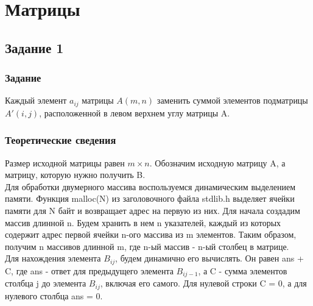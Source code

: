 \documentclass[12pt,a4paper]{report}
\begin{document}
\chapter{Матрицы}
\section{Задание 1}
\subsection{Задание}
Каждый элемент $a_{i j}$ матрицы $A(m, n)$ заменить суммой элементов подматрицы $A'(i, j)$, расположенной в левом верхнем углу матрицы A.
\subsection{Теоретические сведения}
Размер исходной матрицы равен $m \times n$. Обозначим исходную матрицу A, а матрицу, которую нужно  получить B.\\
Для обработки двумерного массива воспользуемся динамическим выделением памяти. Функция malloc(N) из заголовочного файла stdlib.h выделяет ячейки памяти для N байт и возвращает адрес на первую из них. Для начала создадим массив длинной n. Будем хранить в нем n указателей, каждый из которых содержит адрес первой ячейки n-ого массива из m элементов. Таким образом, получим n массивов длинной m, где n-ый массив - n-ый столбец в матрице. \\
Для нахождения элемента $B_{i j}$, будем динамично его вычислять. Он равен ans + C, где ans - ответ для предыдущего элемента $B_{i j-1}$, а C - сумма элементов столбца j до элемента $B_{i j}$, включая его самого. Для нулевой строки C = 0, а для нулевого столбца ans = 0.
\end{document}
